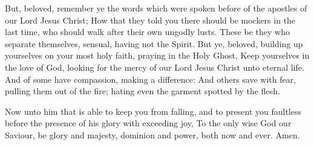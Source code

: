  But, beloved, remember ye the words which were spoken
before of the apostles of our Lord Jesus Christ;  How
that they told you there should be mockers in the last time, who should
walk after their own ungodly lusts.  These be they who
separate themselves, sensual, having not the Spirit.  But
ye, beloved, building up yourselves on your most holy faith, praying in
the Holy Ghost,  Keep yourselves in the love of God,
looking for the mercy of our Lord Jesus Christ unto eternal life.
 And of some have compassion, making a difference:
 And others save with fear, pulling them out of the fire;
hating even the garment spotted by the flesh.

 Now unto him that is able to keep you from falling, and
to present you faultless before the presence of his glory with exceeding
joy,  To the only wise God our Saviour, be glory and
majesty, dominion and power, both now and ever. Amen.
